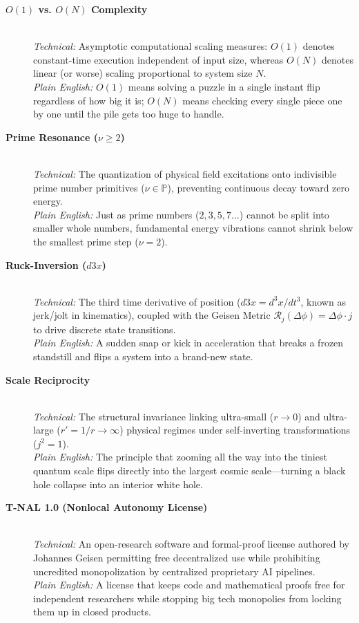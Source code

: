\documentclass[11pt,a4paper,oneside]{article}
\def\dddot#1{d3#1}%
\theoremstyle{definition}
\begin{document}
\begin{description}
    \item[\textbf{$O(1)$ vs. $O(N)$ Complexity}] \hfill \\
    \textit{Technical:} Asymptotic computational scaling measures: $O(1)$ denotes constant-time execution independent of input size, whereas $O(N)$ denotes linear (or worse) scaling proportional to system size $N$. \\
    \textit{Plain English:} $O(1)$ means solving a puzzle in a single instant flip regardless of how big it is; $O(N)$ means checking every single piece one by one until the pile gets too huge to handle.

    \item[\textbf{Prime Resonance ($\nu \ge 2$)}] \hfill \\
    \textit{Technical:} The quantization of physical field excitations onto indivisible prime number primitives ($\nu \in \mathbb{P}$), preventing continuous decay toward zero energy. \\
    \textit{Plain English:} Just as prime numbers ($2, 3, 5, 7\dots$) cannot be split into smaller whole numbers, fundamental energy vibrations cannot shrink below the smallest prime step ($\nu = 2$).

    \item[\textbf{Ruck-Inversion ($\dddot{x}$)}] \hfill \\
    \textit{Technical:} The third time derivative of position ($\dddot{x} = d^3x/dt^3$, known as jerk/jolt in kinematics), coupled with the Geisen Metric $\mathcal{R}_j(\Delta \phi) = \Delta \phi \cdot j$ to drive discrete state transitions. \\
    \textit{Plain English:} A sudden snap or kick in acceleration that breaks a frozen standstill and flips a system into a brand-new state.

    \item[\textbf{Scale Reciprocity}] \hfill \\
    \textit{Technical:} The structural invariance linking ultra-small ($r \to 0$) and ultra-large ($r' = 1/r \to \infty$) physical regimes under self-inverting transformations ($j^2 = 1$). \\
    \textit{Plain English:} The principle that zooming all the way into the tiniest quantum scale flips directly into the largest cosmic scale—turning a black hole collapse into an interior white hole.

    \item[\textbf{T-NAL 1.0 (Nonlocal Autonomy License)}] \hfill \\
    \textit{Technical:} An open-research software and formal-proof license authored by Johannes Geisen permitting free decentralized use while prohibiting uncredited monopolization by centralized proprietary AI pipelines. \\
    \textit{Plain English:} A license that keeps code and mathematical proofs free for independent researchers while stopping big tech monopolies from locking them up in closed products.


\end{description}
\end{document}

